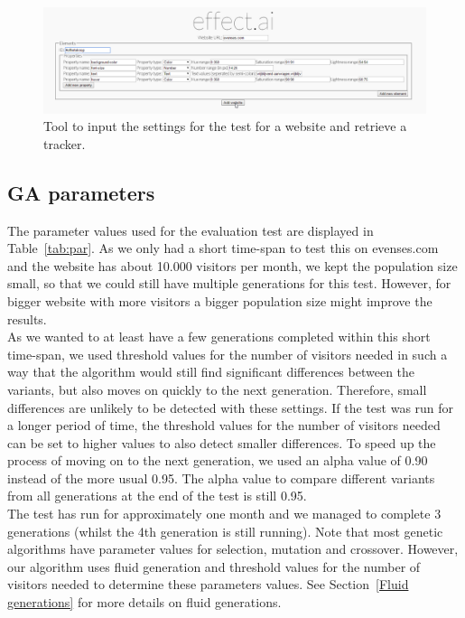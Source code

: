 \documentclass{report}
\begin{document}
\begin{figure}[ht]
	\centering
	\hspace*{-1.7cm}\includegraphics[width=1.3\linewidth]{imgs/settings.png}
	\caption{Tool to input the settings for the test for a website and retrieve a tracker.}
	\label{fig:settings}
\end{figure}

\subsection{GA parameters}
The parameter values used for the evaluation test are displayed in Table~\ref{tab:par}.
As we only had a short time-span to test this on evenses.com and the website has about 10.000 visitors per month, we kept the population size small, so that we could still have multiple generations for this test. However, for bigger website with more visitors a bigger population size might improve the results.\\

As we wanted to at least have a few generations completed within this short time-span, we used threshold values for the number of visitors needed in such a way that the algorithm would still find significant differences between the variants, but also moves on quickly to the next generation. Therefore, small differences are unlikely to be detected with these settings. If the test was run for a longer period of time, the threshold values for the number of visitors needed can be set to higher values to also detect smaller differences. To speed up the process of moving on to the next generation, we used an alpha value of 0.90 instead of the more usual 0.95. The alpha value to compare different variants from all generations at the end of the test is still 0.95.\\

The test has run for approximately one month and we managed to complete 3 generations (whilst the 4th generation is still running). Note that most genetic algorithms have parameter values for selection, mutation and crossover. However, our algorithm uses fluid generation and threshold values for the number of visitors needed to determine these parameters values. See Section~\ref{Fluid generations} for more details on fluid generations.
\end{document}
